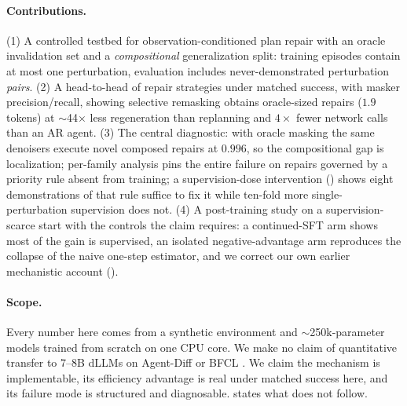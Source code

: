 \documentclass{article}
\begin{document}
\paragraph{Contributions.}
(1) A controlled testbed for observation-conditioned plan repair with an oracle invalidation set and
a \emph{compositional} generalization split: training episodes contain at most one perturbation,
evaluation includes never-demonstrated perturbation \emph{pairs}.
(2) A head-to-head of repair strategies under matched success, with masker precision/recall, showing
selective remasking obtains oracle-sized repairs ($1.9$ tokens) at $\sim$44$\times$ less
regeneration than replanning and $4\times$ fewer network calls than an AR agent.
(3) The central diagnostic: with oracle masking the same denoisers execute novel composed repairs at
$0.996$, so the compositional gap is localization; per-family analysis pins the entire failure on
repairs governed by a priority rule absent from training; a supervision-dose intervention () shows
eight demonstrations of that rule suffice to fix it while ten-fold more single-perturbation
supervision does not.
(4) A post-training study on a supervision-scarce start with the controls the claim requires: a
continued-SFT arm shows most of the gain is supervised, an isolated negative-advantage arm reproduces
the collapse of the naive one-step estimator, and we correct our own earlier mechanistic account
().

\paragraph{Scope.}\label{sec:scope}
Every number here comes from a synthetic environment and $\sim$250k-parameter models trained from
scratch on one CPU core. We make no claim of quantitative transfer to 7--8B dLLMs on Agent-Diff
\citep{agentdiff2026} or BFCL \citep{bfcl2025}. We claim the mechanism is implementable, its
efficiency advantage is real under matched success here, and its failure mode is structured and
diagnosable.  states what does not follow.
\end{document}
